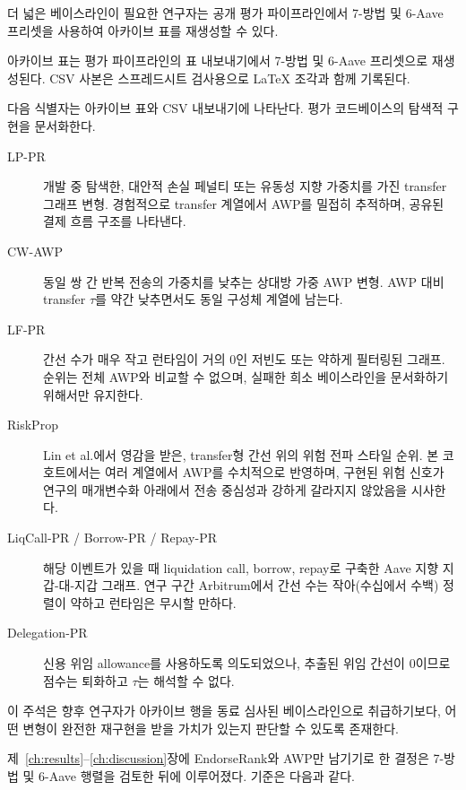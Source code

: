 더 넓은 베이스라인이 필요한 연구자는 공개 평가 파이프라인에서 7-방법 및 6-Aave 프리셋을 사용하여 아카이브 표를 재생성할 수 있다.


아카이브 표는 평가 파이프라인의 표 내보내기에서 7-방법 및 6-Aave 프리셋으로 재생성된다. CSV 사본은 스프레드시트 검사용으로 LaTeX 조각과 함께 기록된다.


다음 식별자는 아카이브 표와 CSV 내보내기에 나타난다. 평가 코드베이스의 탐색적 구현을 문서화한다.

\begin{description}
\item[LP-PR] 개발 중 탐색한, 대안적 손실 페널티 또는 유동성 지향 가중치를 가진 transfer 그래프 변형. 경험적으로 transfer 계열에서 AWP를 밀접히 추적하며, 공유된 결제 흐름 구조를 나타낸다.
\item[CW-AWP] 동일 쌍 간 반복 전송의 가중치를 낮추는 상대방 가중 AWP 변형. AWP 대비 transfer $\tau$를 약간 낮추면서도 동일 구성체 계열에 남는다.
\item[LF-PR] 간선 수가 매우 작고 런타임이 거의 0인 저빈도 또는 약하게 필터링된 그래프. 순위는 전체 AWP와 비교할 수 없으며, 실패한 희소 베이스라인을 문서화하기 위해서만 유지한다.
\item[RiskProp] Lin et al.\citep{44}에서 영감을 받은, transfer형 간선 위의 위험 전파 스타일 순위. 본 코호트에서는 여러 계열에서 AWP를 수치적으로 반영하며, 구현된 위험 신호가 연구의 매개변수화 아래에서 전송 중심성과 강하게 갈라지지 않았음을 시사한다.
\item[LiqCall-PR / Borrow-PR / Repay-PR] 해당 이벤트가 있을 때 liquidation call, borrow, repay로 구축한 Aave 지향 지갑-대-지갑 그래프. 연구 구간 Arbitrum에서 간선 수는 작아(수십에서 수백) 정렬이 약하고 런타임은 무시할 만하다.
\item[Delegation-PR] 신용 위임 allowance를 사용하도록 의도되었으나, 추출된 위임 간선이 0이므로 점수는 퇴화하고 $\tau$는 해석할 수 없다.
\end{description}

이 주석은 향후 연구자가 아카이브 행을 동료 심사된 베이스라인으로 취급하기보다, 어떤 변형이 완전한 재구현을 받을 가치가 있는지 판단할 수 있도록 존재한다.


제~\ref{ch:results}--\ref{ch:discussion}장에 EndorseRank와 AWP만 남기기로 한 결정은 7-방법 및 6-Aave 행렬을 검토한 뒤에 이루어졌다. 기준은 다음과 같다.

